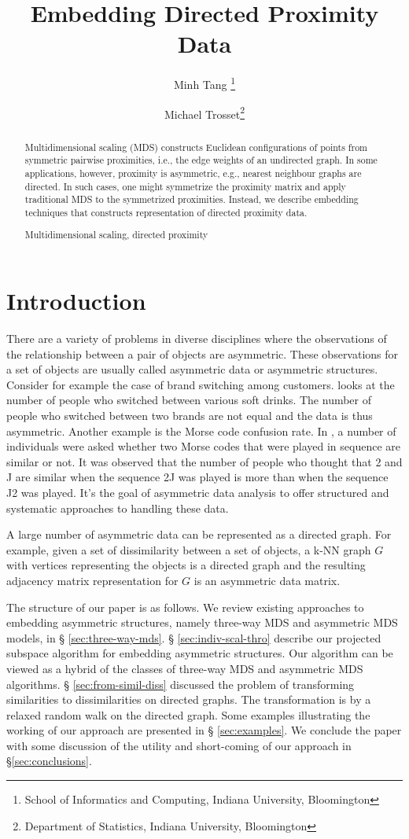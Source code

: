\documentclass[11pt]{asaproc}
\title{Embedding Directed Proximity Data}
\author{Minh Tang \thanks{School of Informatics and Computing, Indiana
    University, Bloomington} \and Michael Trosset\thanks{Department of
    Statistics, Indiana University, Bloomington}}
\begin{document}
\maketitle
\begin{abstract}
Multidimensional scaling (MDS) constructs Euclidean configurations of
points from symmetric pairwise proximities, i.e., the edge weights of
an undirected graph. In some applications, however, proximity is
asymmetric, e.g., nearest neighbour graphs are directed. In such
cases, one might symmetrize the proximity matrix and apply traditional
MDS to the symmetrized proximities. Instead, we describe embedding
techniques that constructs representation of directed proximity data.
\begin{keywords}
Multidimensional scaling, directed proximity
\end{keywords}
\end{abstract}

\section{Introduction}
There are a variety of problems in diverse disciplines where the
observations of the relationship between a pair of objects are
asymmetric. These observations for a set of objects are usually called
asymmetric data or asymmetric structures. Consider for example the
case of brand switching among customers. \citet{desarbo84} looks at
the number of people who switched between various soft drinks. The
number of people who switched between two brands are not equal and the
data is thus asymmetric. Another example is the Morse code confusion
rate. In \citet{rothkopf57}, a number of individuals were asked
whether two Morse codes that were played in sequence are similar or
not. It was observed that the number of people who thought that 2 and
J are similar when the sequence 2J was played is more than when the
sequence J2 was played. It's the goal of asymmetric data analysis to
offer structured and systematic approaches to handling these data.

A large number of asymmetric data can be represented as a directed
graph. For example, given a set of dissimilarity between a set of
objects, a k-NN graph $G$ with vertices representing the objects is a
directed graph and the resulting adjacency matrix representation for
$G$ is an asymmetric data matrix. 

The structure of our paper is as follows. We review  existing
approaches to embedding asymmetric structures, namely 
three-way MDS and asymmetric MDS models, in \S
\ref{sec:three-way-mds}. \S
\ref{sec:indiv-scal-thro} describe our projected subspace algorithm for embedding
asymmetric structures. Our algorithm can be viewed as a hybrid of the
classes of three-way MDS and asymmetric MDS algorithms. \S
\ref{sec:from-simil-diss} discussed the problem of transforming 
similarities to dissimilarities on directed graphs. The
transformation is by a relaxed random walk on the directed graph. Some
examples illustrating the working of our approach are presented in \S
\ref{sec:examples}. We conclude the paper  with some discussion of the
utility and short-coming of our approach in \S \ref{sec:conclusions}. 
\end{document}
